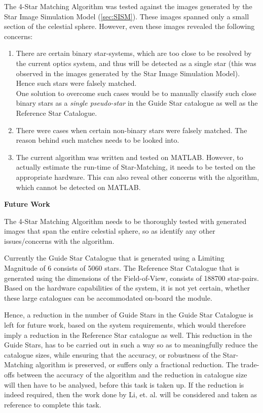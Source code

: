 \documentclass[../../main.tex]{subfiles}
\begin{document}
The 4-Star Matching Algorithm was tested against the images generated by the Star Image Simulation Model (\ref{sec:SISM}). These images spanned only a small section of the celestial sphere. However, even these images revealed the following concerns:
\begin{enumerate}
    \item There are certain binary star-systems, which are too close to be resolved by the current optics system, and thus will be detected as a single star (this was observed in the images generated by the Star Image Simulation Model). Hence such stars were falsely matched. \\
    One solution to overcome such cases would be to manually classify such close binary stars as a \textit{single pseudo-star} in the Guide Star catalogue as well as the Reference Star Catalogue.
    
    \item There were cases when certain non-binary stars were falsely matched. The reason behind such matches needs to be looked into.
    
    \item The current algorithm was written and tested on MATLAB. However, to actually estimate  the run-time of Star-Matching, it needs to be tested on the appropriate hardware. This can also reveal other concerns with the algorithm, which cannot be detected on MATLAB.
\end{enumerate}

\textbf{Future Work}

The 4-Star Matching Algorithm needs to be thoroughly tested with generated images that span the entire celestial sphere, so as identify any other issues/concerns with the algorithm.

Currently the Guide Star Catalogue that is generated using a Limiting Magnitude of 6 consists of 5060 stars. The Reference Star Catalogue that is generated using the dimensions of the Field-of-View, consists of 188700 star-pairs. 
Based on the hardware capabilities of the system, it is not yet certain, whether these large catalogues can be accommodated on-board the module.

Hence, a reduction in the number of Guide Stars in the Guide Star Catalogue is left for future work, based on the system requirements, which would therefore imply a reduction in the Reference Star catalogue as well.
This reduction in the Guide Stars, has to be carried out in such a way so as to meaningfully reduce the catalogue sizes, while ensuring that the accuracy, or robustness of the Star-Matching algorithm is preserved, or suffers only a fractional reduction. The trade-offs between the accuracy of the algorithm and the reduction in catalogue size will then have to be analysed, before this task is taken up.
If the reduction is indeed required, then the work done by Li, et. al. \cite{li2014new} will be considered and taken as reference to complete this task.

\end{document}
